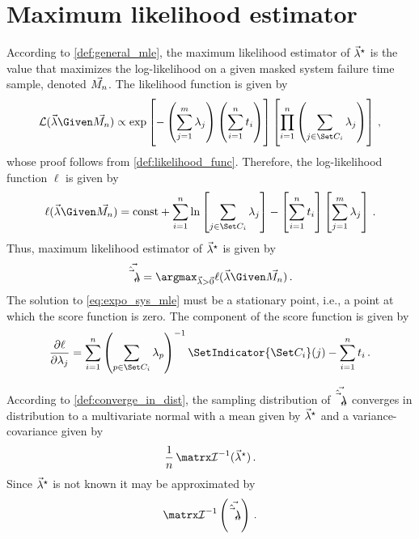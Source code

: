 \documentclass[../main.tex]{subfiles}
\begin{document}

\section{Maximum likelihood estimator}
According to \cref{def:general_mle}, the maximum likelihood estimator of ${\vec\lambda}^{\star}$ is the value that maximizes the log-likelihood on a given masked system failure time sample, denoted $\vec{M_n}$. The likelihood function is given by
\begin{equation}
\label{eq:expo_like}
\likelihood(\vec\lambda \Given \mfs) \propto
    \exp \left [ - \left ( \sum_{j=1}^{m} \lambda_j \right ) \left ( \sum_{i=1}^{n} t_i \right ) \right ]
    \left [ \prod_{i=1}^{n} \left ( \sum_{j \in \cand_i} \lambda_j \right ) \right ]\,,
\end{equation}
whose proof follows from \cref{def:likelihood_func}. Therefore, the log-likelihood function $\ell$ is given by
\begin{equation}
    \ell(\vec{\lambda} \Given \mfs) = \text{const} + \sum_{i=1}^{n} \ln \left [ \sum_{j \in \cand_i} \lambda_j \right ] - \left [ \sum_{i=1}^{n} t_i \right ] \left [ \sum_{j=1}^{m} \lambda_j \right ]\,.
\end{equation}
Thus, maximum likelihood estimator of ${\vec\lambda}^{\star}$ is given by
\begin{equation}
\label{eq:expo_sys_mle}
    \expomle = \argmax_{\vec\lambda > \vec{0}} \ell(\vec\lambda \Given \mfs)\,.
\end{equation}
The solution to \cref{eq:expo_sys_mle} must be a stationary point, i.e., a point at which the score function is zero. The \jth component of the score function is given by
\begin{equation}
\label{eq:score_expo_j}
    \frac{\partial \ell}{\partial \lambda_j} = 
    \sum_{i=1}^{n} \left ( \sum_{p \in \cand_i} \lambda_p \right )^{-1} \SetIndicator{\cand_i}(j) - \sum_{i=1}^{n} t_i\,.
\end{equation}

According to \cref{def:converge_in_dist}, the sampling distribution of $\vec{\hat{\vec\lambda}_n}$ converges in distribution to a multivariate normal with a mean given by ${\vec\lambda}^{\star}$ and a variance-covariance given by
\begin{equation}
    \frac{1}{n} \infomatrx^{-1}(\tparam{\vec\lambda})\,.
\end{equation}
Since ${\vec\lambda}^{\star}$ is not known it may be approximated by
\begin{equation}
    \infomatrx^{-1}\left(\expomle\right)\,.
\end{equation}
\end{document}
